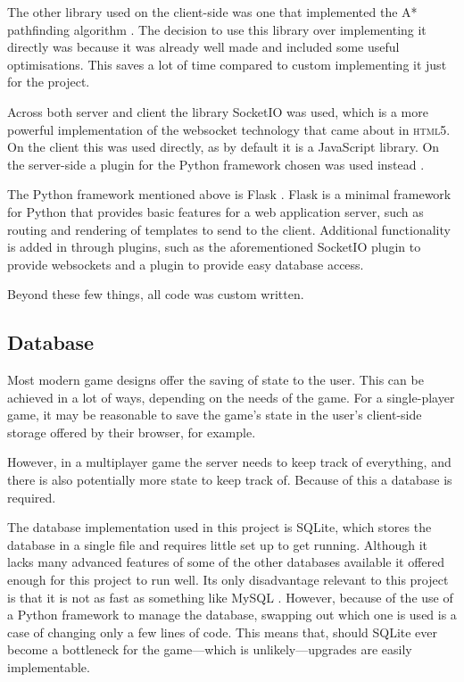 The other library used on the client-side was one that implemented the A* pathfinding algorithm \cite{citeulike:13160393}. The decision to use this library over implementing it directly was because it was already well made and included some useful optimisations. This saves a lot of time compared to custom implementing it just for the project.

Across both server and client the library SocketIO was used, which is a more powerful implementation of the websocket technology that came about in \textsc{html5}. On the client this was used directly, as by default it is a JavaScript library. On the server-side a plugin for the Python framework chosen was used instead \cite{citeulike:13160395}.

The Python framework mentioned above is Flask \cite{citeulike:13160396}. Flask is a minimal framework for Python that provides basic features for a web application server, such as routing and rendering of templates to send to the client. Additional functionality is added in through plugins, such as the aforementioned SocketIO plugin to provide websockets and a plugin to provide easy database access.

Beyond these few things, all code was custom written.

\subsection{Database}
Most modern game designs offer the saving of state to the user. This can be achieved in a lot of ways, depending on the needs of the game. For a single-player game, it may be reasonable to save the game's state in the user's client-side storage offered by their browser, for example.

However, in a multiplayer game the server needs to keep track of everything, and there is also potentially more state to keep track of. Because of this a database is required.

The database implementation used in this project is SQLite, which stores the database in a single file and requires little set up to get running. Although it lacks many advanced features of some of the other databases available it offered enough for this project to run well. Its only disadvantage relevant to this project is that it is not as fast as something like MySQL \cite{citeulike:13160403}. However, because of the use of a Python framework to manage the database, swapping out which one is used is a case of changing only a few lines of code. This means that, should SQLite ever become a bottleneck for the game---which is unlikely---upgrades are easily implementable.

